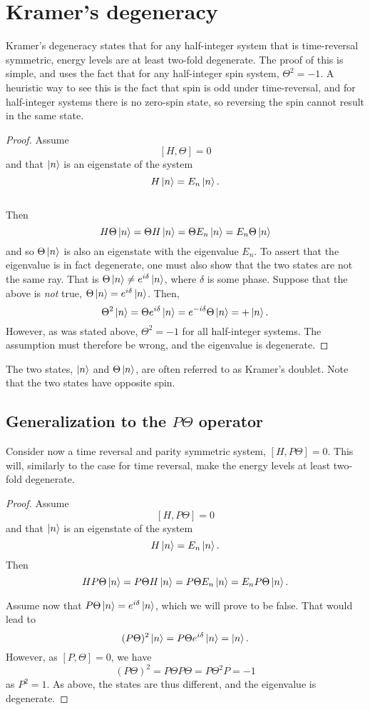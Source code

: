 \section{Kramer's degeneracy}


Kramer's degeneracy states that for any half-integer system that is time-reversal symmetric, energy levels are at least two-fold degenerate.
The proof of this is simple, and uses the fact that for any half-integer spin system, $\Theta^2 = -1$.
A heuristic way to see this is the fact that spin is odd under time-reversal, and for half-integer systems there is no zero-spin state, so reversing the spin cannot result in the same state.
\begin{proof}
  Assume
  $$ [H, \Theta] = 0 $$
  and that $\ket{n}$ is an eigenstate of the system
  $$ H \ket{n} = E_n \ket{n}.$$\\
  Then
  $$
  H \Theta \ket{n} = \Theta H \ket{n} = \Theta E_n \ket{n} = E_n \Theta \ket{n}
  $$
  and so $\Theta \ket{n}$ is also an eigenstate with the eigenvalue $E_n$.
  To assert that the eigenvalue is in fact degenerate, one must also show that the two states are not the same ray.
  That is $\Theta \ket{n} \neq e^{i \delta} \ket{n}$, where $\delta$ is some phase.
  Suppose that the above is \emph{not} true, $\Theta \ket{n} = e^{i \delta} \ket{n}$.
  Then,
  $$
  \Theta^2 \ket{n} = \Theta e^{i\delta} \ket{n} = e^{-i\delta} \Theta \ket{n} = + \ket{n}.
  $$
  However, as was stated above, $\Theta^2 = -1$ for all half-integer systems.
  The assumption must therefore be wrong, and the eigenvalue is degenerate.
\end{proof}
The two states, $\ket{n}$ and $\Theta \ket{n}$, are often referred to as Kramer's doublet.
Note that the two states have opposite spin.

\subsection{Generalization to the $P \Theta$ operator}
Consider now a time reversal and parity symmetric system, $[H, P \Theta] = 0$.
This will, similarly to the case for time reversal, make the energy levels at least two-fold degenerate.
\begin{proof}
  Assume
  $$
  [H,P \Theta] = 0
  $$
  and that $\ket{n}$ is an eigenstate of the system
  $$
  H\ket{n} = E_n\ket{n}.
  $$
  Then
  $$
  H P \Theta\ket{n} =
  P\Theta H \ket{n} =
  P \Theta E_n \ket{n} =
  E_n P\Theta \ket{n}.
  $$

  Assume now that $P\Theta \ket{n} = e^{i\delta} \ket{n}$, which we will prove to be false.
  That would lead to
  $$
  (P\Theta)^2 \ket{n} = P\Theta e^{i\delta} \ket{n}
  = \ket{n}.
  $$
  However, as $[P, \Theta] = 0$, we have
  $$
  (P\Theta)^2 =
  P\Theta P \Theta=
  P\Theta^2 P=
  -1
  $$
  as $P^2 = 1$.
  As above, the states are thus different, and the eigenvalue is degenerate.
\end{proof}
